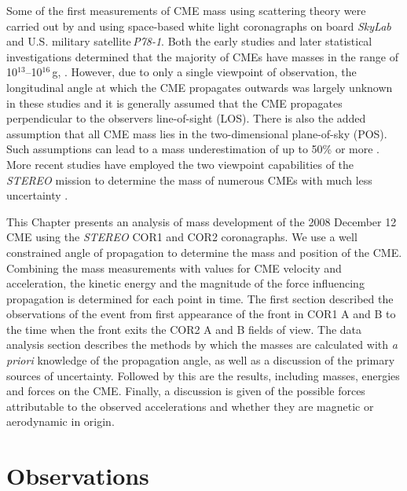 Some of the first measurements of CME mass using scattering theory were carried out by \citet{munro1979} and \citet{poland1981} using space-based white light coronagraphs on board \emph{SkyLab} and U.S. military satellite\,\emph{P78-1}.  Both the early studies  and later statistical investigations determined that the majority of CMEs have masses in the range of 10$^{13}$--10$^{16}$\,g, \citep{vourlidas02, vour2010}. However, due to only a single viewpoint of observation, the longitudinal angle at which the CME propagates outwards was largely unknown in these studies 
and it is generally assumed that the CME propagates perpendicular to the observers line-of-sight (LOS). There is also the added assumption that all CME mass lies in the two-dimensional plane-of-sky (POS). Such assumptions can lead to a mass underestimation of up to 50\% or more \citep{vou00}. More recent studies have employed the two viewpoint capabilities of the \emph{STEREO} mission to determine the mass of numerous 
CMEs with much less uncertainty \citep{cola09}. 
	
This Chapter presents an analysis of mass development of the 2008 December 12 CME using the \emph{STEREO} COR1 and COR2 coronagraphs. We use a well constrained angle of propagation to determine the mass and position of the CME. Combining the mass measurements with values for CME velocity and acceleration, the kinetic energy and the magnitude of the force influencing propagation is determined for each point in time. The first section described the observations of the event from first appearance of the front in COR1 A and B to the time when the front exits the COR2 A and B fields of view. 
The data analysis section describes the methods by which the masses are calculated with \emph{a priori} knowledge of the propagation angle, as well as a discussion of the primary sources of uncertainty. Followed by this are the results, including masses, energies and forces on the CME. Finally, a discussion is given of the possible forces attributable to the observed accelerations and whether they are magnetic or aerodynamic in origin. 

\section{Observations}

